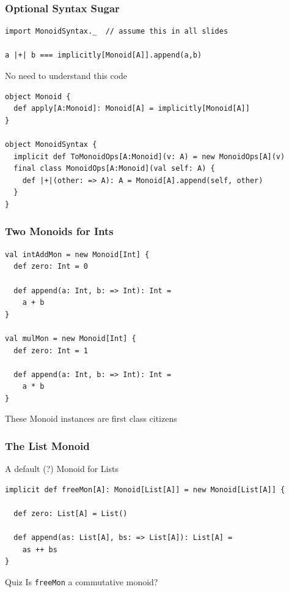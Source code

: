 \documentclass{beamer}
\begin{document}
\begin{frame}[fragile]\frametitle{Optional Syntax Sugar}
  \begin{block}{}
  \begin{lstlisting}
import MonoidSyntax._  // assume this in all slides

a |+| b === implicitly[Monoid[A]].append(a,b)
  \end{lstlisting}
  \end{block}

  \begin{block}{No need to understand this code}
  \begin{lstlisting}
object Monoid {
  def apply[A:Monoid]: Monoid[A] = implicitly[Monoid[A]]
}

object MonoidSyntax {
  implicit def ToMonoidOps[A:Monoid](v: A) = new MonoidOps[A](v)
  final class MonoidOps[A:Monoid](val self: A) {
    def |+|(other: => A): A = Monoid[A].append(self, other)
  }
}
  \end{lstlisting}
  \end{block}
\end{frame}

\begin{frame}[fragile]\frametitle{Two Monoids for Ints}
  \begin{block}{}
  \begin{lstlisting}
val intAddMon = new Monoid[Int] {
  def zero: Int = 0

  def append(a: Int, b: => Int): Int =
    a + b
}

val mulMon = new Monoid[Int] {
  def zero: Int = 1

  def append(a: Int, b: => Int): Int =
    a * b
}
  \end{lstlisting}
  \end{block}
  These Monoid \alert{instances} are first class citizens
\end{frame}

\begin{frame}[fragile]\frametitle{The List Monoid}
  \begin{block}{A default (?) Monoid for Lists}
  \begin{lstlisting}
implicit def freeMon[A]: Monoid[List[A]] = new Monoid[List[A]] {

  def zero: List[A] = List()

  def append(as: List[A], bs: => List[A]): List[A] =
    as ++ bs
}
  \end{lstlisting}
  \end{block}

  \begin{block}{Quiz}
Is \texttt{freeMon} a commutative monoid?
  \end{block}
\end{frame}
\end{document}
